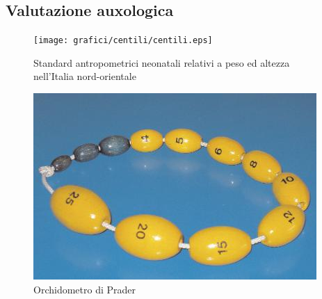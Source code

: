 \subsection{Valutazione auxologica}

\begin{figure}[h]
  \begin{center}
      \texttt{[image: grafici/centili/centili.eps]} %
  \end{center}
  \caption{Standard antropometrici neonatali relativi a peso ed altezza nell'Italia nord-orientale}
\end{figure}

\begin{figure}[h]
  \begin{center}
	\includegraphics[scale=0.75]{grafici/orchidometro.jpg}
  \end{center}
  \caption{Orchidometro di Prader}
\end{figure}


